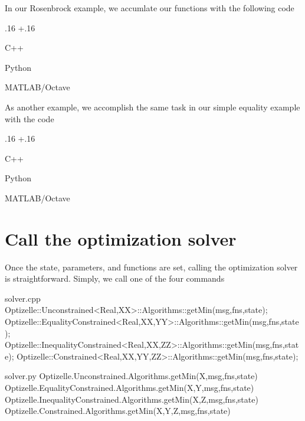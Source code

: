 \documentclass{report}
\newlength{\gobble}
\newenvironment{boldlist}
    {\begin{list}{}{
        \labelwidth.16\textwidth
        \leftmargin\dimexpr\leftmargin+.16\textwidth
        \renewcommand\makelabel[1]{%
            \textbf{##1}}}}
    {\vspace{-\dimexpr\baselineskip+2\itemsep}\end{list}}
\newcommand{\shortexampleitem}[2]{
    \item[Language] #1
    \item[Code]\begin{minipage}[t]{\textwidth}\vspace{\dimexpr-\medskipamount-2ex}#2\end{minipage}
    \item[]}
\newcommand{\secsolve}{Call the optimization solver}
\begin{document}
        In our Rosenbrock example, we accumlate our functions with the following code
\begin{boldlist}
    \shortexampleitem
        {C++}
        {}

    \shortexampleitem
        {Python}
        {}

    \shortexampleitem
        {MATLAB/Octave}
        {}
\end{boldlist}
\noindent As another example, we accomplish the same task in our simple equality example with the code
\begin{boldlist}
    \shortexampleitem
        {C++}
        {}

    \shortexampleitem
        {Python}
        {}

    \shortexampleitem
        {MATLAB/Octave}
        {}
\end{boldlist}


\section{\secsolve}\label{sec:solve}

       Once the state, parameters, and functions are set, calling the optimization solver is straightforward.  Simply, we call one of the four commands
\begin{filecontents*}{solver.cpp}
Optizelle::Unconstrained<Real,XX>::Algorithms::getMin(msg,fns,state);
Optizelle::EqualityConstrained<Real,XX,YY>::Algorithms::getMin(msg,fns,state);
Optizelle::InequalityConstrained<Real,XX,ZZ>::Algorithms::getMin(msg,fns,state);
Optizelle::Constrained<Real,XX,YY,ZZ>::Algorithms::getMin(msg,fns,state);
\end{filecontents*}

\begin{filecontents*}{solver.py}
Optizelle.Unconstrained.Algorithms.getMin(X,msg,fns,state)
Optizelle.EqualityConstrained.Algorithms.getMin(X,Y,msg,fns,state)
Optizelle.InequalityConstrained.Algorithms.getMin(X,Z,msg,fns,state)
Optizelle.Constrained.Algorithms.getMin(X,Y,Z,msg,fns,state)
\end{filecontents*}
\end{document}
